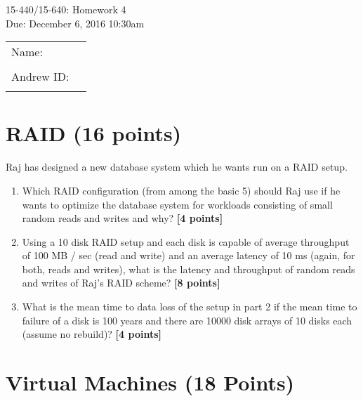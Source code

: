 \documentclass{article}
\newcommand{\mycoursenum}{15-440/15-640}
\newcommand{\myhwnum}{4}
\newcommand{\myname}{}   %
\newcommand{\myandrew}{}  %
\begin{document}
\medskip
\thispagestyle{plain}
\begin{center}
{\Large \mycoursenum: Homework \myhwnum}\\
Due: December 6, 2016 10:30am \\
\medskip
\begin{tabular}{| l p{3in}|}
\hline
Name: \myname& \\
& \\ \hline
Andrew ID: \myandrew & \\
&\\
\hline
\end{tabular}
\end{center}




\section{RAID (16 points)}

Raj has designed a new database system which he wants run on a RAID setup.

\begin{enumerate}
    
\item Which RAID configuration (from among the basic 5) should Raj use if he wants to optimize the database system for workloads consisting of small random reads and writes and why? \textbf{[4 points]}


\item Using a 10 disk RAID setup and each disk is capable of average throughput of 100 MB / sec
(read and write) and an average latency of 10 ms (again, for both, reads and writes), what is
the latency and throughput of random reads and writes of Raj's RAID scheme? \textbf{[8 points]}


\item What is the mean time to data loss of the setup in part 2 if the mean time to failure of a disk
is 100 years and there are 10000 disk arrays of 10 disks each (assume no rebuild)? \textbf{[4 points]}


\end{enumerate}

\section{Virtual Machines (18 Points)}
\end{document}
